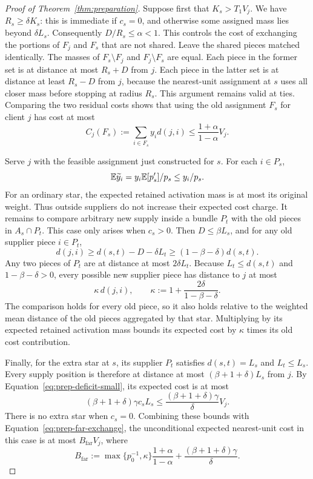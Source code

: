 \begin{proof}[Proof of Theorem~\ref{thm:preparation}]
Suppose first that $K_s>T_1V_j$.  We have $R_s\ge\delta K_s$: this is
immediate if $c_s=0$, and otherwise some assigned mass lies beyond
$\delta L_s$.  Consequently $D/R_s\le\alpha<1$.  This controls the
cost of exchanging the portions of $F_j$ and $F_s$ that are not shared.
Leave the shared pieces matched identically.  The masses of
$F_s\setminus F_j$ and $F_j\setminus F_s$ are equal.  Each piece in the
former set is at distance at most $R_s+D$ from $j$.  Each piece in the
latter set is at distance at least $R_s-D$ from $j$, because the
nearest-unit assignment at $s$ uses all closer mass before stopping at
radius $R_s$.  This argument remains valid at ties.  Comparing the two
residual costs shows that using the old assignment $F_s$ for client $j$
has cost at most
\begin{equation}\label{eq:prep-far-exchange}
 C_j(F_s):=\sum_{i\in F_s}y_i d(j,i)
 \le\frac{1+\alpha}{1-\alpha}V_j.
\end{equation}

Serve $j$ with the feasible assignment just constructed for $s$.
For each $i\in P_s$,
\[
 \mathbb E\widetilde y_i
 =y_i\mathbb E[p'_s]/p_s\le y_i/p_s.
\]
For an ordinary star, the expected retained activation mass is at most
its original weight.  Thus outside suppliers do not increase their
expected cost charge.  It remains to compare arbitrary new supply
inside a bundle $P_t$ with the old pieces in $A_s\cap P_t$.
This case only arises when $c_s>0$.  Then $D\le\beta L_s$, and for any
old supplier piece $i\in P_t$,
\[
 d(j,i)\ge d(s,t)-D-\delta L_t
 \ge(1-\beta-\delta)d(s,t).
\]
Any two pieces of $P_t$ are at distance at most $2\delta L_t$.
Because $L_t\le d(s,t)$ and $1-\beta-\delta>0$, every possible new
supplier piece has distance to $j$ at most
\[
 \kappa\,d(j,i),\qquad
 \kappa:=1+\frac{2\delta}{1-\beta-\delta}.
\]
The comparison holds for every old piece, so it also holds relative to
the weighted mean distance of the old pieces aggregated by that star.
Multiplying by its expected retained activation mass bounds its
expected cost by $\kappa$ times its old cost contribution.

Finally, for the extra star at $s$, its supplier $P_t$ satisfies
$d(s,t)=L_s$ and $L_t\le L_s$.  Every supply position is therefore at
distance at most $(\beta+1+\delta)L_s$ from $j$.  By
Equation~\ref{eq:prep-deficit-small}, its expected cost is at most
\[
 (\beta+1+\delta)\gamma c_s L_s
 \le\frac{(\beta+1+\delta)\gamma}{\delta}V_j.
\]
There is no extra star when $c_s=0$.
Combining these bounds with Equation~\ref{eq:prep-far-exchange}, the
unconditional expected nearest-unit cost in this case is at most
$B_{\mathrm{far}}V_j$, where
\begin{equation}\label{eq:prep-far-factor}
 B_{\mathrm{far}}
 :=\max\{p_0^{-1},\kappa\}\frac{1+\alpha}{1-\alpha}
   +\frac{(\beta+1+\delta)\gamma}{\delta}.
\end{equation}


\end{proof}
